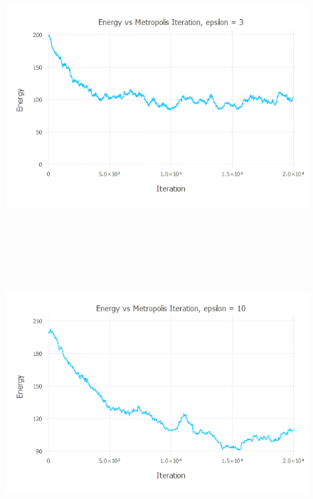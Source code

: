 \documentclass{article}
\begin{document}
\begin{figure}[H]
	\includegraphics[width=6in,height=4in]{"equilibration3"}
\end{figure}
\begin{figure}[H]
	\includegraphics[width=6in,height=4in]{"equilibration10"}
\end{figure}
\end{document}
